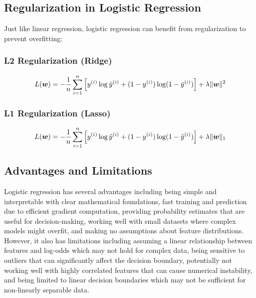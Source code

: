 \subsection{Regularization in Logistic Regression}

Just like linear regression, logistic regression can benefit from regularization to prevent overfitting:

\subsubsection{L2 Regularization (Ridge)}

\begin{equation}
L(\boldsymbol{w}) = -\frac{1}{n} \sum_{i=1}^{n} \left[y^{(i)} \log \hat{y}^{(i)} + (1-y^{(i)}) \log(1-\hat{y}^{(i)})\right] + \lambda \|\boldsymbol{w}\|^2
\end{equation}

\subsubsection{L1 Regularization (Lasso)}

\begin{equation}
L(\boldsymbol{w}) = -\frac{1}{n} \sum_{i=1}^{n} \left[y^{(i)} \log \hat{y}^{(i)} + (1-y^{(i)}) \log(1-\hat{y}^{(i)})\right] + \lambda \|\boldsymbol{w}\|_1
\end{equation}

\subsection{Advantages and Limitations}

Logistic regression has several advantages including being simple and interpretable with clear mathematical foundations, fast training and prediction due to efficient gradient computation, providing probability estimates that are useful for decision-making, working well with small datasets where complex models might overfit, and making no assumptions about feature distributions. However, it also has limitations including assuming a linear relationship between features and log-odds which may not hold for complex data, being sensitive to outliers that can significantly affect the decision boundary, potentially not working well with highly correlated features that can cause numerical instability, and being limited to linear decision boundaries which may not be sufficient for non-linearly separable data.

